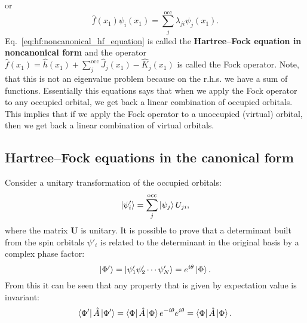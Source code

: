 \documentclass[../Main/chem532-notes.tex]{subfiles}
\begin{document}
or
\begin{equation} \label{eq:hf:noncanonical_hf_equation}
\hat{f}(x_1)  \psi_{i}(x_1) 
= \sum_{j}^\mathrm{occ} \lambda_{ji} \psi_{j}(x_1).
\end{equation}
Eq.~\eqref{eq:hf:noncanonical_hf_equation} is called the \textbf{Hartree--Fock equation in noncanonical form} and the operator $\hat{f}(x_1) = \hat{h}(x_1) + \sum_{j}^\mathrm{occ} \hat{J}_j(x_1)- \hat{K}_j(x_1)$ is called the Fock operator.
Note, that this is not an eigenvalue problem because on the r.h.s. we have a sum of functions.
Essentially this equations says that when we apply the Fock operator to any occupied orbital, we get back a linear combination of occupied orbitals.
This implies that if we apply the Fock operator to a unoccupied (virtual) orbital, then we get back a linear combination of virtual orbitals.

\subsection{Hartree--Fock equations in the canonical form}
Consider a unitary transformation of the occupied orbitals:
\begin{equation}
\ket{\psi'_i} = \sum_{j}^\mathrm{occ} \ket{\psi_j} U_{ji},
\end{equation}
where the matrix $\mathbf{U}$ is unitary.
It is possible to prove that a determinant built from the spin orbitals $\psi'_i$ is related to the determinant in the original basis by a complex phase factor:
\begin{equation}
\ket{\Phi'} = \ket{\psi'_1 \psi'_2 \cdots \psi'_N} = e^{i\theta} \ket{\Phi}.
\end{equation}
From this it can be seen that any property that is given by expectation value is invariant:
\begin{equation}
\bra{\Phi'}\hat{A} \ket{\Phi'} = \bra{\Phi}\hat{A} \ket{\Phi} e^{-i\theta} e^{i\theta} =  \bra{\Phi}\hat{A} \ket{\Phi}.
\end{equation}
\end{document}
